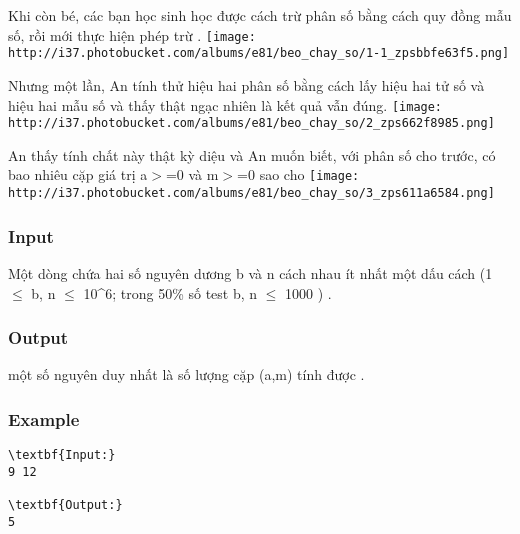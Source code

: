 



    Khi còn bé, các bạn học sinh học được cách trừ phân số bằng cách quy đồng mẫu số, rồi mới thực hiện phép trừ      .   
\texttt{[image: http://i37.photobucket.com/albums/e81/beo\_chay\_so/1-1\_zpsbbfe63f5.png]}

    Nhưng một lần, An tính thử hiệu hai phân số bằng cách lấy hiệu hai tử số và hiệu hai mẫu số và thấy thật ngạc nhiên là kết quả vẫn đúng.    
\texttt{[image: http://i37.photobucket.com/albums/e81/beo\_chay\_so/2\_zps662f8985.png]}

     An thấy tính chất này thật kỳ diệu và An muốn biết, với phân số         cho trước, có bao nhiêu cặp giá trị         a$>$=0 và m$>$=0         sao cho     
\texttt{[image: http://i37.photobucket.com/albums/e81/beo\_chay\_so/3\_zps611a6584.png]}

\subsubsection{   Input  }

    Một dòng chứa hai số nguyên dương b       và n       cách nhau ít nhất một dấu cách (1  $\le$  b, n  $\le$  10^6; trong 50\% số test b, n  $\le$  1000       )      .  

\subsubsection{   Output  }

    một số nguyên duy nhất là số lượng cặp (a,m)       tính được      .  

\subsubsection{   Example  }
\begin{verbatim}
\textbf{Input:}
9 12

\textbf{Output:}
5
\end{verbatim}
